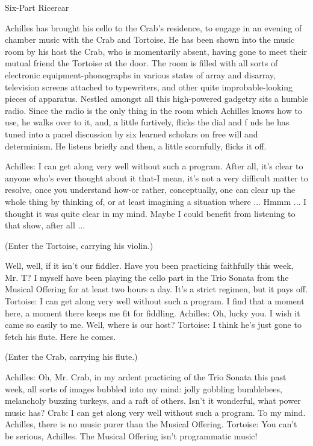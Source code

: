 
                               Six-Part Ricercar

   Achilles has brought his cello to the Crab's residence, to engage in an evening of
   chamber music with the Crab and Tortoise. He has been shown into the music
   room by his host the Crab, who is momentarily absent, having gone to meet their
   mutual friend the Tortoise at the door. The room is filled with all sorts of electronic
   equipment-phonographs in various states of array and disarray, television screens
   attached to typewriters, and other quite improbable-looking pieces of apparatus.
   Nestled amongst all this high-powered gadgetry sits a humble radio. Since the
   radio is the only thing in the room which Achilles knows how to use, he walks over
   to it, and, a little furtively, flicks the dial and f nds he has tuned into a panel
   discussion by six learned scholars on free will and determinism. He listens briefly
   and then, a little scornfully, flicks it off.

Achilles: I can get along very well without such a program. After all, it's clear to anyone
  who's ever thought about it that-I mean, it's not a very difficult matter to resolve, once
  you understand how-or rather, conceptually, one can clear up the whole thing by
  thinking of, or at least imagining a situation where ... Hmmm ... I thought it was quite
  clear in my mind. Maybe I could benefit from listening to that show, after all ...

   (Enter the Tortoise, carrying his violin.)

   Well, well, if it isn't our fiddler. Have you been practicing faithfully this week, Mr. T?
   I myself have been playing the cello part in the Trio Sonata from the Musical Offering
   for at least two hours a day. It's a strict regimen, but it pays off.
Tortoise: I can get along very well without such a program. I find that a moment here, a
   moment there keeps me fit for fiddling.
Achilles: Oh, lucky you. I wish it came so easily to me. Well, where is our host?
Tortoise: I think he's just gone to fetch his flute. Here he comes.

   (Enter the Crab, carrying his flute.)

Achilles: Oh, Mr. Crab, in my ardent practicing of the Trio Sonata this past week, all
   sorts of images bubbled into my mind: jolly gobbling bumblebees, melancholy
   buzzing turkeys, and a raft of others. Isn't it wonderful, what power music has?
Crab: I can get along very well without such a program. To my mind.
Achilles, there is no music purer than the Musical Offering.
Tortoise: You can't be serious, Achilles. The Musical Offering isn't programmatic music!




